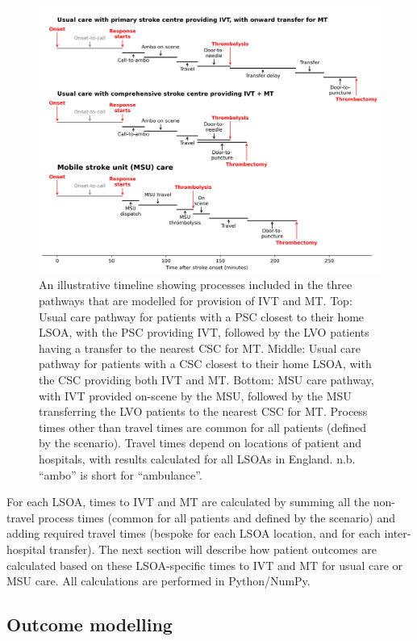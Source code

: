 \begin{figure}[h]
    \centering
    \includegraphics[width=0.85\linewidth]{images/stroke_treatment.jpg}
    \caption{An illustrative timeline showing processes included in the three pathways that are modelled for provision of IVT and MT. Top: Usual care pathway for patients with a PSC closest to their home LSOA, with the PSC providing IVT, followed by the LVO patients having a transfer to the nearest CSC for MT. Middle: Usual care pathway for patients with a CSC closest to their home LSOA, with the CSC providing both IVT and MT. Bottom: MSU care pathway, with IVT provided on-scene by the MSU, followed by the MSU transferring the LVO patients to the nearest CSC for MT. Process times other than travel times are common for all patients (defined by the scenario). Travel times depend on locations of patient and hospitals, with results calculated for all LSOAs in England. n.b. ``ambo'' is short for ``ambulance''.}
    \label{fig:process}
\end{figure}

For each LSOA, times to IVT and MT are calculated by summing all the non-travel process times (common for all patients and defined by the scenario) and adding required travel times (bespoke for each LSOA location, and for each inter-hospital transfer). The next section will describe how patient outcomes are calculated based on these LSOA-specific times to IVT and MT for usual care or MSU care. All calculations are performed in Python/NumPy.

\subsection{Outcome modelling}


